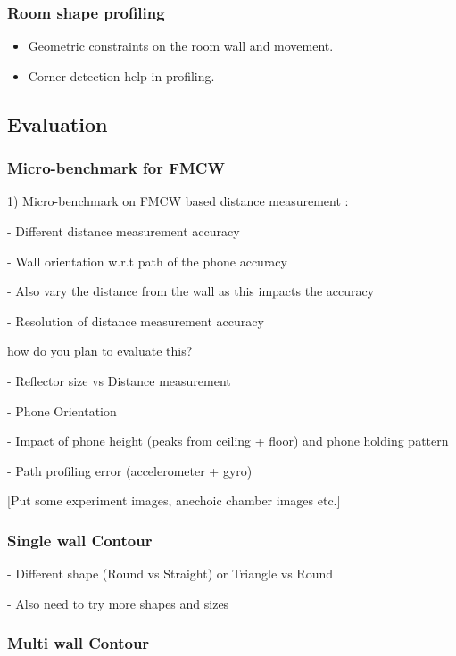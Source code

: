 \subsubsection{Room shape profiling}
\begin{itemize}
\item Geometric constraints on the room wall and movement.
\item Corner detection help in profiling.
\end{itemize}


\subsection{Evaluation}
\subsubsection{Micro-benchmark for FMCW}

1) Micro-benchmark on FMCW based distance measurement :
 
    - Different distance measurement accuracy

    - Wall orientation w.r.t path of the phone accuracy

 - Also vary the distance from the wall as this impacts the accuracy
 
    - Resolution of distance measurement accuracy

how do you plan to evaluate this? 

    - Reflector size vs Distance measurement
  
    - Phone Orientation

   - Impact of phone height (peaks from ceiling + floor) and phone holding pattern

   - Path profiling error (accelerometer + gyro)
   
[Put some experiment images, anechoic chamber images etc.]

\subsubsection{Single wall Contour}

  - Different shape (Round vs Straight) or Triangle vs Round

   - Also need to try more shapes and sizes

\subsubsection{Multi wall Contour}

